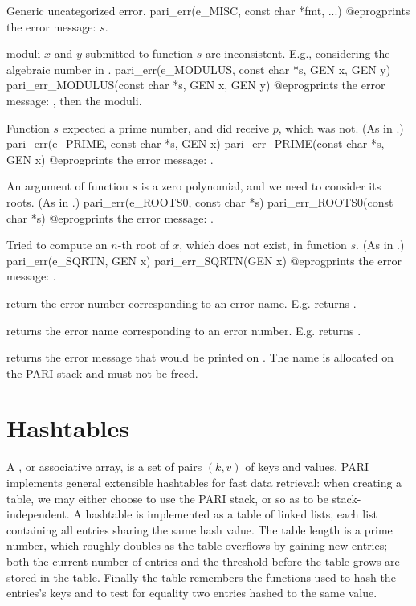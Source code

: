  Generic uncategorized error.
\bprog
  pari_err(e_MISC, const char *fmt, ...)
@eprog\noindent prints the error message: $s$.

 moduli $x$ and $y$ submitted to function $s$ are
inconsistent. E.g., considering the algebraic number
 in .
\bprog
  pari_err(e_MODULUS, const char *s, GEN x, GEN y)
  pari_err_MODULUS(const char *s, GEN x, GEN y)
@eprog\noindent prints the error message: ,
then the moduli.

 Function $s$ expected a prime number, and did receive $p$,
which was not. (As in .)
\bprog
  pari_err(e_PRIME, const char *s, GEN x)
  pari_err_PRIME(const char *s, GEN x)
@eprog\noindent prints the error message: .

 An argument of function $s$ is a zero polynomial, and
we need to consider its roots. (As in .)
\bprog
  pari_err(e_ROOTS0, const char *s)
  pari_err_ROOTS0(const char *s)
@eprog\noindent prints the error message: .

 Tried to compute an $n$-th root of $x$, which does not
exist, in function $s$.
(As in .)
\bprog
  pari_err(e_SQRTN, GEN x)
  pari_err_SQRTN(GEN x)
@eprog\noindent prints the error message: .


 return the error number corresponding to
an error name. E.g.  returns .

 returns the error name
corresponding to an error number. E.g.  returns
.

 returns the error message that would be
printed on  . The name is allocated on the PARI stack and
must not be freed.

\section{Hashtables}
A , or associative array, is a set of pairs $(k,v)$ of keys
and values. PARI implements general extensible hashtables for fast data
retrieval: when creating a table, we may either choose to use the PARI stack,
or  so as to be stack-independent. A hashtable is implemented as
a table of linked lists, each list containing all entries sharing the same
hash value. The table length is a prime number, which roughly doubles as the
table overflows by gaining new entries; both the current number of entries
and the threshold before the table grows are stored in the table. Finally the
table remembers the functions used to hash the entries's keys and to test for
equality two entries hashed to the same value.

